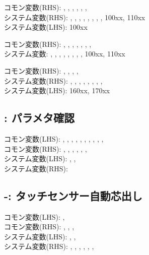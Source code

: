 \begin{hosoku}\small
コモン変数(RHS): , , , , , , \\
システム変数(RHS): , , , , , , , , \ttNum100xx, \ttNum110xx\\
システム変数(LHS): \ttNum100xx
\end{hosoku}

\begin{hosoku}\small
コモン変数(RHS): , , , , , , , \\
システム変数: , , , , , , , , \ttNum100xx, \ttNum110xx
\end{hosoku}

\begin{hosoku}\small
コモン変数(RHS): , , , , \\
システム変数(RHS): , , , , , , , , \\
システム変数(LHS): \ttNum160xx, \ttNum170xx
\end{hosoku}

\subsection{: パラメタ確認}
\begin{hosoku}\small
コモン変数(LHS): , , , , , , , , , , \\
コモン変数(RHS): , , , , , , \\
システム変数(LHS): , , \\
システム変数(RHS): 
\end{hosoku}

\subsection{-: タッチセンサー自動芯出し}
\begin{hosoku}\small
コモン変数(LHS): , \\
コモン変数(RHS): , , , \\
システム変数(LHS): , , \\
システム変数(RHS): , , , , , , 
\end{hosoku}

